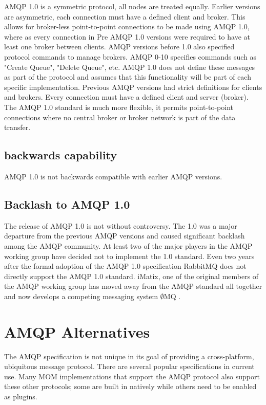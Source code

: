 \documentclass{thesis}
\begin{document}
AMQP 1.0 is a symmetric protocol, all nodes are treated equally.  Earlier versions are asymmetric, each connection must have a defined client and broker.  This allows for broker-less point-to-point connections to be made using AMQP 1.0, where as every connection in Pre AMQP 1.0 versions were required to have at least one broker between clients.  AMQP versions before 1.0 also specified protocol commands to manage brokers.  AMQP 0-10 specifies commands such as "Create Queue", "Delete Queue", etc.  AMQP 1.0 does not define these messages as part of the protocol and assumes that this functionality will be part of each specific implementation.  \cite{REDHAT1} 
Previous AMQP versions had strict definitions for clients and brokers.  Every connection must have a defined client and server (broker).  The AMQP 1.0 standard is much more flexible, it permits point-to-point connections where no central broker or broker network is part of the data transfer.  

\subsection{backwards capability}

AMQP 1.0 is not backwards compatible with earlier AMQP versions.  

\subsection{Backlash to AMQP 1.0}

The release of AMQP 1.0 is not without controversy.  The 1.0 was a major departure from the previous AMQP versions and caused significant backlash among the AMQP community.  At least two of the major players in the AMQP working group have decided not to implement the 1.0 standard.  Even two years after the formal adoption of the AMQP 1.0 specification RabbitMQ does not directly support the AMQP 1.0 standard.  iMatix, one of the original members of the AMQP working group has moved away from the AMQP standard all together and now develops a competing messaging system $\emptyset$MQ \cite{ZERO_MQ}. 

\section{AMQP Alternatives}
The AMQP specification is not unique in its goal of providing a cross-platform, ubiquitous message protocol.  There are several popular specifications in current use.  Many MOM implementations that support the AMQP protocol also support these other protocols; some are built in natively while others need to be enabled as plugins.   
\end{document}
